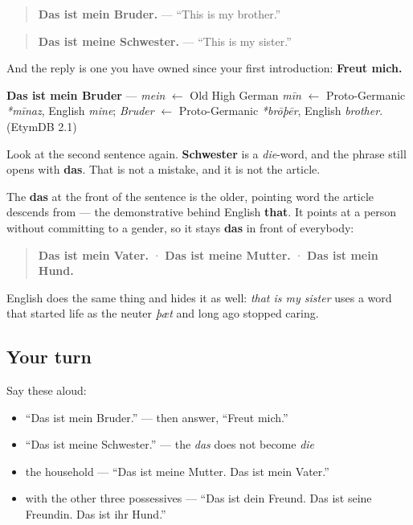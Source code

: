 \begin{quote}
\textbf{Das ist mein Bruder.} — \textquotedblleft{}This is my brother.\textquotedblright{}
\end{quote}

\begin{quote}
\textbf{Das ist meine Schwester.} — \textquotedblleft{}This is my sister.\textquotedblright{}
\end{quote}

And the reply is one you have owned since your first introduction: \textbf{Freut mich.}

\begin{cousinweb}
\textbf{Das ist mein Bruder} — \emph{mein} $\leftarrow$ Old High German \emph{mīn} $\leftarrow$ Proto-Germanic \emph{*mīnaz}, English \emph{mine}; \emph{Bruder} $\leftarrow$ Proto-Germanic \emph{*brōþēr}, English \emph{brother}. (EtymDB 2.1)
\end{cousinweb}

\begin{grammarlens}[title={Grammar Lens: the das that ignores gender}]
Look at the second sentence again. \textbf{Schwester} is a \emph{die}-word, and the phrase still opens with \textbf{das}. That is not a mistake, and it is not the article.

The \textbf{das} at the front of the sentence is the older, pointing word the article descends from — the demonstrative behind English \textbf{that}. It points at a person without committing to a gender, so it stays \textbf{das} in front of everybody:

\begin{quote}
\textbf{Das ist mein Vater.} · \textbf{Das ist meine Mutter.} · \textbf{Das ist mein Hund.}
\end{quote}

English does the same thing and hides it as well: \emph{that is my sister} uses a word that started life as the neuter \emph{þæt} and long ago stopped caring.
\end{grammarlens}

\subsection*{Your turn}
Say these aloud:

\begin{itemize}
\raggedright
  \item \textquotedblleft{}Das ist mein Bruder.\textquotedblright{} — then answer, \textquotedblleft{}Freut mich.\textquotedblright{}
  \item \textquotedblleft{}Das ist meine Schwester.\textquotedblright{} — the \emph{das} does not become \emph{die}
  \item the household — \textquotedblleft{}Das ist meine Mutter. Das ist mein Vater.\textquotedblright{}
  \item with the other three possessives — \textquotedblleft{}Das ist dein Freund. Das ist seine Freundin. Das ist ihr Hund.\textquotedblright{}
\end{itemize}

